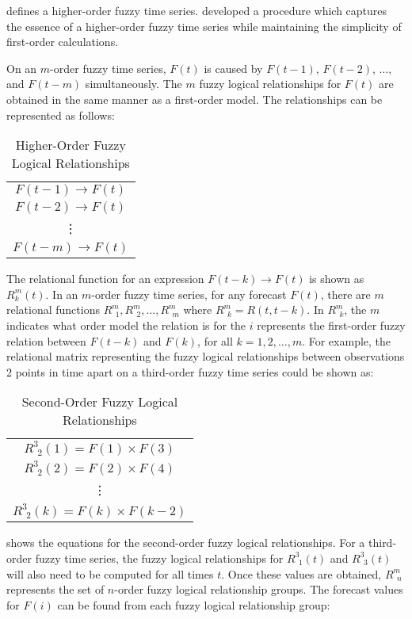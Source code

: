 \documentclass[12pt]{article}
\theoremstyle{definition}
\begin{document}
 defines a higher-order fuzzy time series. \cite{tsai1999study} developed a procedure which captures the essence of a higher-order fuzzy time series while maintaining the simplicity of first-order calculations.

On an $m$-order fuzzy time series, $F(t)$ is caused by $F(t-1)$, $F(t-2)$, $\ldots$, and $F(t-m)$ simultaneously. The $m$ fuzzy logical relationships for $F(t)$ are obtained in the same manner as a first-order model. The relationships can be represented as follows:

\begin{table}[H]
	\center
	\begin{tabular}{ c }
  	$F(t-1) \rightarrow F(t)$ \\
  	$F(t-2) \rightarrow F(t)$ \\
  	\vdots \\
  	$F(t-m) \rightarrow F(t)$ \\
	\end{tabular}
	\caption{Higher-Order Fuzzy Logical Relationships}
\end{table}

The relational function for an expression $F(t-k) \rightarrow F(t)$ is shown as $R^{m}_{k}(t)$. In an $m$-order fuzzy time series, for any forecast $F(t)$, there are $m$ relational functions $R^{m}_{\ \ 1}, R^{m}_{\ \ 2}, \ldots, R^{m}_{\ \ m}$ where $R^{m}_{\ \ k}=R(t,t-k)$. In $R^{m}_{\ \ k}$, the $m$ indicates what order model the relation is for the $i$ represents the first-order fuzzy relation between $F(t-k)$ and $F(k)$, for all $k={1,2,\ldots,m}$. For example, the relational matrix representing the fuzzy logical relationships between observations 2 points in time apart on a third-order fuzzy time series could be shown as:

\begin{table}[H]
	\center
	\begin{tabular}{ c }
  	$R^{3}_{\ \ 2}(1) = F(1) \times F(3)$ \\
  	$R^{3}_{\ \ 2}(2) = F(2) \times F(4)$ \\
  	\vdots \\
  	$R^{3}_{\ \ 2}(k) = F(k) \times F(k-2)$ \\
	\end{tabular}
	\caption{Second-Order Fuzzy Logical Relationships}
	\label{second-order-rels}
\end{table}

 shows the equations for the second-order fuzzy logical relationships. For a third-order fuzzy time series, the fuzzy logical relationships for $R^{3}_{\ \ 1}(t)$ and $R^{3}_{\ \ 3}(t)$ will also need to be computed for all times $t$. Once these values are obtained, $R^{m}_{\ \ n}$ represents the set of $n$-order fuzzy logical relationship groups. The forecast values for $F(i)$ can be found from each fuzzy logical relationship group:
\end{document}
